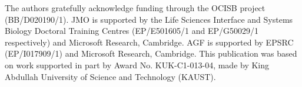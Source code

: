 \documentclass{article}
\begin{document}
The authors gratefully acknowledge funding through the OCISB project (BB/D020190/1).
JMO is supported by the Life Sciences Interface and Systems Biology Doctoral Training Centres (EP/E501605/1 and EP/G50029/1 respectively) and Microsoft Research, Cambridge. 
AGF is supported by EPSRC (EP/I017909/1) and Microsoft Research, Cambridge. 
This publication was based on work supported in part by Award No. KUK-C1-013-04, made by King Abdullah University of Science and Technology (KAUST).

{}

\end{document}
